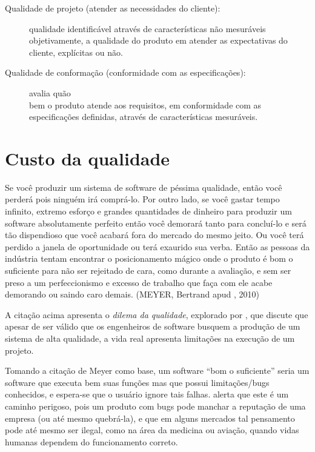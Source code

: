 \documentclass[
	12pt,				%
	openright,			%
	oneside,			%
	a4paper,			%
	english,			%
	brazil,				%
	]{abntex2}
\begin{document}
\begin{description}
    \item [Qualidade de projeto (atender as necessidades do cliente):] qualidade identificável através de características não mesuráveis objetivamente, a qualidade do produto em atender as expectativas do cliente, explícitas ou não.
    \item [Qualidade de conformação (conformidade com as especificações):] avalia quão \\ bem o produto atende aos requisitos, em conformidade com as especificações definidas, através de características mesuráveis.
\end{description}

\section{Custo da qualidade}
\begin{citacao} %
Se você produzir um sistema de software de péssima qualidade, então você perderá pois ninguém irá comprá-lo. Por outro lado, se você gastar tempo infinito, extremo esforço e grandes quantidades de dinheiro para produzir um software absolutamente perfeito então você demorará tanto para concluí-lo e será tão dispendioso que você acabará fora do mercado do mesmo jeito. Ou você terá perdido a janela de oportunidade ou terá exaurido sua verba. Então as pessoas da indústria tentam encontrar o posicionamento mágico onde o produto é bom o suficiente para não ser rejeitado de cara, como durante a avaliação, e sem ser preso a um perfeccionismo e excesso de trabalho que faça com ele acabe demorando ou saindo caro demais. (MEYER, Bertrand apud , 2010)
\end{citacao}


A citação acima apresenta o \emph{dilema da qualidade}, explorado por , que discute que apesar de ser válido que os engenheiros de software busquem a produção de um sistema de alta qualidade, a vida real apresenta limitações na execução de um projeto.

Tomando a citação de Meyer como base, um software ``bom o suficiente'' seria um software que executa bem suas funções mas que possui limitações/bugs conhecidos, e espera-se que o usuário ignore tais falhas.  alerta que este é um caminho perigoso, pois um produto com bugs pode manchar a reputação de uma empresa (ou até mesmo quebrá-la), e que em alguns mercados tal pensamento pode até mesmo ser ilegal, como na área da medicina ou aviação, quando vidas humanas dependem do funcionamento correto.
\end{document}
